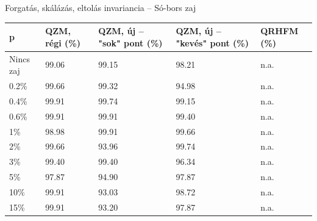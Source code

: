 \documentclass{beamer}
\begin{document}
\begin{frame}{Forgatás, skálázás, eltolás invariancia -- Só-bors zaj}
    \vskip 1cm
    \begin{table}[tbp]
        \centering
        \begin{tabular}{|p{1.5cm}|p{1.5cm}|p{2cm}|p{2.1cm}|p{1.5cm}|} \hline
            p & \textbf{QZM, régi} (\%) & \textbf{QZM, új} -- "sok" pont (\%)& \textbf{QZM, új} -- "kevés" pont (\%) & \textbf{QRHFM} (\%) \\ \hline\hline
            Nincs zaj & 99.06 & 99.15 & 98.21 & n.a. \\ \hline
            0.2\% & 99.66 & 99.32 & 94.98 & n.a.  \\ \hline
            0.4\% & 99.91 & 99.74 & 99.15 & n.a. \\ \hline
            0.6\% & 99.91 & 99.91 & 99.40 & n.a. \\ \hline
            1\% & 98.98 & 99.91 & 99.66 & n.a. \\ \hline
            2\% & 99.66 & 93.96 & 99.74 & n.a. \\ \hline
            3\% & 99.40 & 99.40 & 96.34 & n.a. \\ \hline
            5\% & 97.87 & 94.90 & 97.87 & n.a. \\ \hline
            10\% & 99.91 & 93.03 & 98.72 & n.a. \\ \hline
            15\% & 99.91 & 93.20 & 97.87 & n.a. \\ \hline
        \end{tabular}
    \end{table}
\end{frame}
\end{document}
